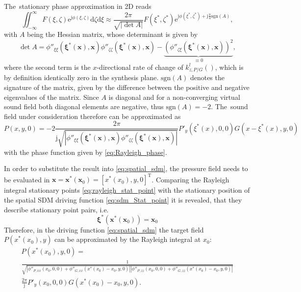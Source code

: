 \documentclass[12pt,a4paper]{article}
\newcommand{\td}{\mathrm{d}}
\newcommand{\te}{\mathrm{e}}
\newcommand{\ti}{\mathrm{j}}
\newcommand{\vx}{\mathbf{x}}
\newcommand{\vxi}{\bm{\xi}}
\newcommand{\vxo}{\mathbf{x}_0}
\begin{document}
The~stationary phase approximation in 2D reads
\begin{equation}
\iint_{-\infty}^{\infty} F(\xi,\zeta) \te^{\ti \phi(\xi,\zeta)}\td \zeta \td \xi \approx
\frac{2\pi}{\sqrt{|\det A|}}F(\xi^*,\zeta^*) \te^{\ti \phi (\xi^*,\zeta^*) + \ti \frac{\pi}{4} \text{sgn} (A)},
\end{equation}
with $A$ being the Hessian matrix, whose determinant is given by
\begin{equation}
\det A = \phi''_{\xi\xi}(\vxi^*(\vx),\vx) \phi''_{\zeta\zeta}(\vxi^*(\vx),\vx) - \underbrace{\left( \phi''_{\zeta\xi}(\vxi^*(\vx),\vx) \right)^2}_{ \equiv 0},
\end{equation}
where the second term is the $x$-directional rate of change of $k^l_{z,P/G}()$, which is by definition identically zero in the synthesis plane. $\text{sgn}(A)$ denotes the signature of the matrix, given by the difference between the positive and negative eigenvalues of the matrix. Since $A$ is diagonal and for a non-converging virtual sound field both diagonal elements are negative, thus $\text{sgn} (A) = -2$.
The~sound field under consideration therefore can be approximated as
\begin{equation}
P(x,y,0) =  -2 \frac{2\pi}{\ti \sqrt{|\phi''_{\xi\xi}(\vxi^*(\vx),\vx) \phi''_{\zeta\zeta}(\vxi^*(\vx),\vx)|}} P'_y(\xi^*(x),0,0) G(x-\xi^*(x),y,0)
\label{eq:Rayleigh_SPA}
\end{equation}
with the phase function given by \eqref{eq:Rayleigh_phase}.

In order to substitute the result into \eqref{eq:spatial_sdm}, the pressure field needs to be evaluated in $\vx = \vx^*(\vxo) = [x^*(x_0), y, 0]^{\mathrm{T}}$.
Comparing the Rayleigh integral stationary points \eqref{eq:rayleigh_stat_point} with the stationary position of the spatial SDM driving function \eqref{eq:sdm_Stat_point} it is revealed, that they describe stationary point pairs, i.e.
%
\begin{equation}
\vxi^*(\vx^*(\vx_0)) = \vx_0
\end{equation}
%
Therefore, in the driving function \eqref{eq:spatial_sdm} the target field $P(x^*(x_0),y)$ can be approximated by the Rayleigh integral at $x_0$:
%
\begin{multline}
P(x^*(x_0),y,0) = \\ \frac{1}{\sqrt{ 
\left| \phi''_{P,xx}(x_0,0,0) + \phi''_{G,xx}(x^*(x_0) - x_0,y,0) \right|
\left| \phi''_{P,zz}(x_0,0,0	) + \phi''_{G,zz}(x^*(x_0) - x_0,y,0) \right|
}}
\\
 \frac{2\pi}{\ti}  P'_y(x_0,0,0) G(x^*(x_0) - x_0,y,0).
\end{multline}
\end{document}
